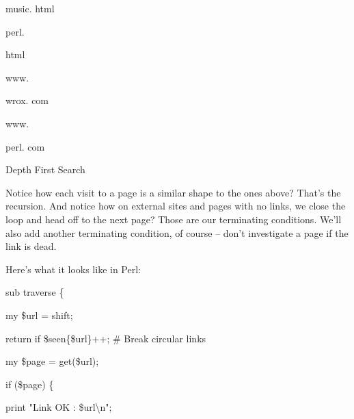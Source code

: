 \documentclass[a4paper,11pt]{book}
\begin{document}
\noindent 

\noindent 

\noindent 

\noindent 

\noindent 

\noindent 

\noindent 

\noindent 

\noindent music. html

\noindent 

\noindent 

\noindent 

\noindent 

\noindent perl.

\noindent html

\noindent 

\noindent 

\noindent 

\noindent 

\noindent www.

\noindent wrox. com

\noindent www.

\noindent perl. com

\noindent 

\noindent 

\noindent 

\noindent Depth First Search

\noindent 

\noindent 

\noindent Notice how each visit to a page is a similar shape to the ones above? That's the recursion. And notice how on external sites and pages with no links, we close the loop and head off to the next page? Those are our terminating conditions. We'll also add another terminating condition, of course -- don't investigate a page if the link is dead.

\noindent 

\noindent Here's what it looks like in Perl:

\noindent 

\noindent sub traverse \{

\noindent my \$url = shift;

\noindent return if \$seen\{\$url\}++; \# Break circular links

\noindent my \$page = get(\$url);

\noindent if (\$page) \{

\noindent print "Link OK : \$url\textbackslash n";
\end{document}
